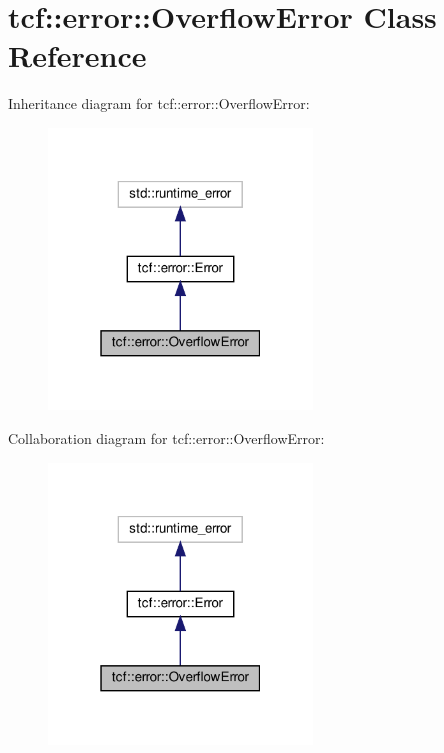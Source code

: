 \hypertarget{classtcf_1_1error_1_1OverflowError}{}\section{tcf\+:\+:error\+:\+:Overflow\+Error Class Reference}
\label{classtcf_1_1error_1_1OverflowError}


Inheritance diagram for tcf\+:\+:error\+:\+:Overflow\+Error\+:
\nopagebreak
\begin{figure}[H]
\begin{center}
\leavevmode
\includegraphics[width=199pt]{classtcf_1_1error_1_1OverflowError__inherit__graph}
\end{center}
\end{figure}


Collaboration diagram for tcf\+:\+:error\+:\+:Overflow\+Error\+:
\nopagebreak
\begin{figure}[H]
\begin{center}
\leavevmode
\includegraphics[width=199pt]{classtcf_1_1error_1_1OverflowError__coll__graph}
\end{center}
\end{figure}
